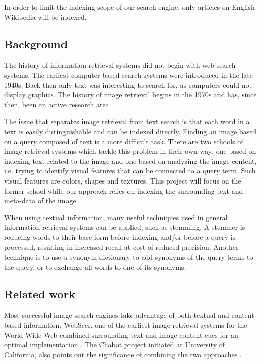 \documentclass[a4paper]{article}
\begin{document}
In order to limit the indexing scope of our search engine, only articles on English Wikipedia will be indexed.

\subsection{Background} 
The history of information retrieval systems did not begin with web search systems. The earliest computer-based search systems were introduced in the late 1940s. Back then only text was interesting to search for, as computers could not display graphics. The history of image retrieval begins in the 1970s and has, since then, been an active research area. \cite{ir-history}

The issue that separates image retrieval from text search is that each word in a text is easily distinguishable and can be indexed directly. Finding an image based on a query composed of text is a more difficult task. There are two schools of image retrieval systems which tackle this problem in their own way: one based on indexing text related to the image and one based on analyzing the image content, i.e. trying to identify visual features that can be connected to a query term. Such visual features are colors, shapes and textures. This project will focus on the former school while our approach relies on indexing the surrounding text and meta-data of the image. \cite{image-retrieval-history} 

When using textual information, many useful techniques used in general information retrieval systems can be applied, such as stemming. A stemmer is reducing words to their base form before indexing and/or before a query is processed, resulting in increased recall at cost of reduced precision. Another technique is to use a synonym dictionary to add synonyms of the query terms to the query, or to exchange all words to one of its synonyms. \cite{stemming} \cite{expansion}

\subsection{Related work}
Most successful image search engines take advantage of both textual and content-based information. WebSeer, one of the earliest image retrieval systems for the World Wide Web combined surrounding text and image content cues for an optimal implementation \cite{WebSeer}. The Chabot project initiated at University of California, also points out the significance of combining the two approaches \cite{Chabot-project}.
\end{document}
